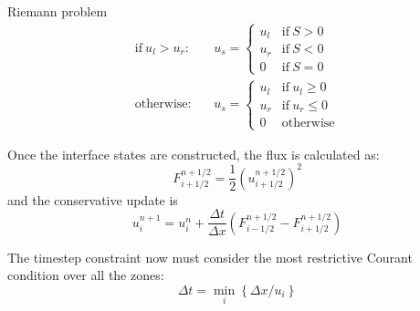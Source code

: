Riemann problem
\begin{eqnarray}
\mathrm{if~} u_l > u_r:&& u_s = \left \{ \begin{array}{cl}
                u_l & \mathrm{if~} S > 0 \\ 
                u_r & \mathrm{if~} S < 0 \\
                0   & \mathrm{if~} S = 0 \end{array} \right .   \\[1em]
%
\mathrm{otherwise:}&& u_s = \left \{ \begin{array}{clc}
                u_l & \mathrm{if~} u_l \ge 0 \\  
                u_r & \mathrm{if~} u_r \le 0 \\  
                0   & \mathrm{otherwise} \end{array} \right .   
\end{eqnarray}
               
Once the interface states are constructed, the flux is calculated as:
\begin{equation}
F^{n+1/2}_{i+1/2} = \frac{1}{2} \left (u_{i+1/2}^{n+1/2} \right )^2
\end{equation}
and the conservative update is
\begin{equation}
u_i^{n+1} = u_i^n + \frac{\Delta t}{\Delta x} 
   \left ( F_{i-1/2}^{n+1/2} - F_{i+1/2}^{n+1/2} \right )
\end{equation}

The timestep constraint now must consider the most restrictive Courant 
condition over all the zones:
\begin{equation}
\Delta t = \min_i \left \{ \Delta x / u_i \right \}
\end{equation}


